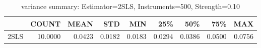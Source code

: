 \begin{table}[ht]
\centering
\caption{variance summary: Estimator=2SLS, Instruments=500, Strength=0.10}
\begin{tabular}{lrrrrrrrr}
\toprule
 & COUNT & MEAN & STD & MIN & 25\% & 50\% & 75\% & MAX \\
\midrule
2SLS & 10.0000 & 0.0423 & 0.0182 & 0.0183 & 0.0294 & 0.0386 & 0.0500 & 0.0756 \\
\bottomrule
\end{tabular}
\end{table}
